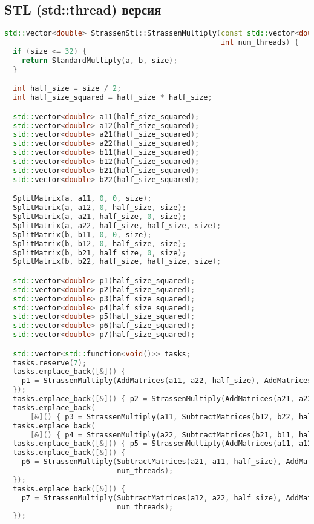 \documentclass[14pt,a4paper]{extarticle}
\begin{document}
\subsection{STL (std::thread) версия}
\begin{lstlisting}[language=C++]
std::vector<double> StrassenStl::StrassenMultiply(const std::vector<double>& a, const std::vector<double>& b, int size,
                                                  int num_threads) {
  if (size <= 32) {
    return StandardMultiply(a, b, size);
  }

  int half_size = size / 2;
  int half_size_squared = half_size * half_size;

  std::vector<double> a11(half_size_squared);
  std::vector<double> a12(half_size_squared);
  std::vector<double> a21(half_size_squared);
  std::vector<double> a22(half_size_squared);
  std::vector<double> b11(half_size_squared);
  std::vector<double> b12(half_size_squared);
  std::vector<double> b21(half_size_squared);
  std::vector<double> b22(half_size_squared);

  SplitMatrix(a, a11, 0, 0, size);
  SplitMatrix(a, a12, 0, half_size, size);
  SplitMatrix(a, a21, half_size, 0, size);
  SplitMatrix(a, a22, half_size, half_size, size);
  SplitMatrix(b, b11, 0, 0, size);
  SplitMatrix(b, b12, 0, half_size, size);
  SplitMatrix(b, b21, half_size, 0, size);
  SplitMatrix(b, b22, half_size, half_size, size);

  std::vector<double> p1(half_size_squared);
  std::vector<double> p2(half_size_squared);
  std::vector<double> p3(half_size_squared);
  std::vector<double> p4(half_size_squared);
  std::vector<double> p5(half_size_squared);
  std::vector<double> p6(half_size_squared);
  std::vector<double> p7(half_size_squared);

  std::vector<std::function<void()>> tasks;
  tasks.reserve(7);
  tasks.emplace_back([&]() {
    p1 = StrassenMultiply(AddMatrices(a11, a22, half_size), AddMatrices(b11, b22, half_size), half_size, num_threads);
  });
  tasks.emplace_back([&]() { p2 = StrassenMultiply(AddMatrices(a21, a22, half_size), b11, half_size, num_threads); });
  tasks.emplace_back(
      [&]() { p3 = StrassenMultiply(a11, SubtractMatrices(b12, b22, half_size), half_size, num_threads); });
  tasks.emplace_back(
      [&]() { p4 = StrassenMultiply(a22, SubtractMatrices(b21, b11, half_size), half_size, num_threads); });
  tasks.emplace_back([&]() { p5 = StrassenMultiply(AddMatrices(a11, a12, half_size), b22, half_size, num_threads); });
  tasks.emplace_back([&]() {
    p6 = StrassenMultiply(SubtractMatrices(a21, a11, half_size), AddMatrices(b11, b12, half_size), half_size,
                          num_threads);
  });
  tasks.emplace_back([&]() {
    p7 = StrassenMultiply(SubtractMatrices(a12, a22, half_size), AddMatrices(b21, b22, half_size), half_size,
                          num_threads);
  });


\end{lstlisting}
\end{document}

